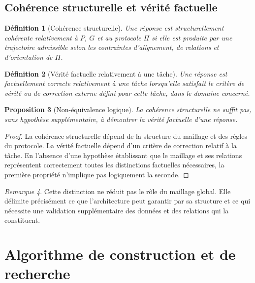 \documentclass[11pt,a4paper,oneside]{book}
\newtheorem{definition}{Définition}[chapter]
\newtheorem{proposition}[definition]{Proposition}
\theoremstyle{remark}
\newtheorem{remarque}[definition]{Remarque}
\begin{document}
\section{Cohérence structurelle et vérité factuelle}

\begin{definition}[Cohérence structurelle]
Une réponse est structurellement cohérente relativement à \(P\),
\(G\) et au protocole \(\Pi\) si elle est produite par une trajectoire
admissible selon les contraintes d'alignement, de relations et
d'orientation de \(\Pi\).
\end{definition}

\begin{definition}[Vérité factuelle relativement à une tâche]
Une réponse est factuellement correcte relativement à une tâche
lorsqu'elle satisfait le critère de vérité ou de correction externe
défini pour cette tâche, dans le domaine concerné.
\end{definition}

\begin{proposition}[Non-équivalence logique]
La cohérence structurelle ne suffit pas, sans hypothèse supplémentaire,
à démontrer la vérité factuelle d'une réponse.
\end{proposition}

\begin{proof}
La cohérence structurelle dépend de la structure du maillage et
des règles du protocole. La vérité factuelle dépend d'un critère
de correction relatif à la tâche. En l'absence d'une hypothèse
établissant que le maillage et ses relations représentent
correctement toutes les distinctions factuelles nécessaires,
la première propriété n'implique pas logiquement la seconde.
\end{proof}

\begin{remarque}
Cette distinction ne réduit pas le rôle du maillage global. Elle
délimite précisément ce que l'architecture peut garantir par sa
structure et ce qui nécessite une validation supplémentaire des
données et des relations qui la constituent.
\end{remarque}


\chapter{Algorithme de construction et de recherche}
\end{document}
